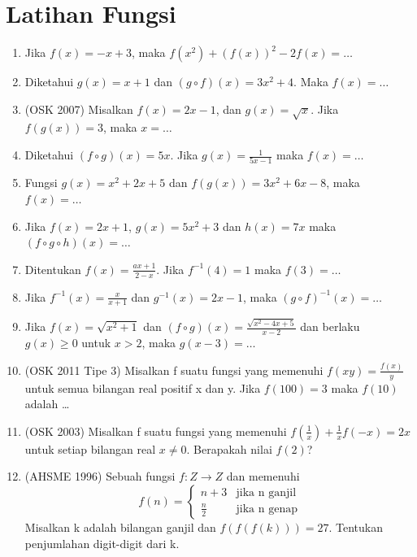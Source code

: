 \documentclass[12pt]{scrartcl}
\theoremstyle{definition}
\begin{document}
\section*{Latihan Fungsi}
\begin{enumerate}
    \item Jika $f(x) = -x+3$, maka $f(x^2) + (f(x))^2 - 2f(x) = \dots$
    
    \item Diketahui $g(x) = x+1$ dan $(g \circ f)(x) = 3x^2+4$. Maka $f(x) = \dots$
    
    \item (OSK 2007) Misalkan $f(x) = 2x-1$, dan $g(x) = \sqrt{x}$. Jika $f(g(x)) = 3$, maka $x = \dots$
    
    \item Diketahui $(f \circ g)(x) = 5x$. Jika $g(x) = \frac{1}{5x-1}$ maka $f(x) = \dots$
    
    \item Fungsi $g(x) = x^2+2x+5$ dan $f(g(x)) = 3x^2+6x-8$, maka $f(x) = \dots$
    
    \item Jika $f(x) = 2x+1$, $g(x) = 5x^2+3$ dan $h(x) = 7x$ maka $(f \circ g \circ h)(x) = \dots$
    
    \item Ditentukan $f(x) = \frac{ax+1}{2-x}$. Jika $f^{-1}(4) = 1$ maka $f(3) = \dots$
    
    \item Jika $f^{-1}(x) = \frac{x}{x+1}$ dan $g^{-1}(x) = 2x-1$, maka $(g \circ f)^{-1}(x) = \dots$
    
    \item Jika $f(x) = \sqrt{x^2+1}$ dan $(f \circ g)(x) = \frac{\sqrt{x^2-4x+5}}{x-2}$ dan berlaku $g(x) \ge 0$ untuk $x>2$, maka $g(x-3) = \dots$
    
    \item (OSK 2011 Tipe 3) Misalkan f suatu fungsi yang memenuhi $f(xy) = \frac{f(x)}{y}$ untuk semua bilangan real positif x dan y. Jika $f(100)=3$ maka $f(10)$ adalah \dots
    
    \item (OSK 2003) Misalkan f suatu fungsi yang memenuhi $f(\frac{1}{x}) + \frac{1}{x}f(-x) = 2x$ untuk setiap bilangan real $x \ne 0$. Berapakah nilai $f(2)$?
    
    \item (AHSME 1996) Sebuah fungsi $f : Z \to Z$ dan memenuhi
    \[ f(n) = \begin{cases} n+3 & \text{jika n ganjil} \\ \frac{n}{2} & \text{jika n genap} \end{cases} \]
    Misalkan k adalah bilangan ganjil dan $f(f(f(k))) = 27$. Tentukan penjumlahan digit-digit dari k.
    

\end{enumerate}
\end{document}
